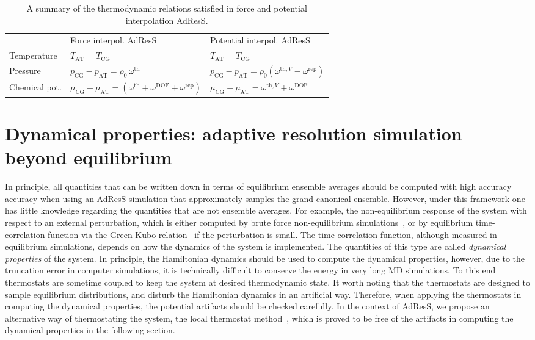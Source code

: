 \documentclass[epjST]{svjour}
\newcommand{\AT}[0]{\textrm{AT}}
\newcommand{\CG}[0]{\textrm{CG}}
\newcommand{\thf}{{\textrm{th}}}
\newcommand{\rep}{{\textrm{rep}}}
\newcommand{\dof}{{\textrm{DOF}}}
\begin{document}
\begin{table}
  \centering
  \caption{A summary of the thermodynamic relations satisfied in force and potential interpolation AdResS.}
  \label{tab:thermodynamic}
  \begin{tabular*}{0.99\textwidth}{@{\extracolsep{\fill}}lll}\hline\hline
    &         Force interpol. AdResS     &       Potential interpol. AdResS \\
    Temperature    &   {$T_\AT = T_\CG$}                                                & {$T_\AT = T_\CG$}                                        \\
    Pressure       &   {$p_\CG - p_\AT = \rho_0\, \omega^\thf$}                          & {$p_\CG - p_\AT = \rho_0(\omega^{\thf,V} - \omega^\rep)$} \\
    Chemical pot.  &   {$\mu_\CG - \mu_\AT = (\omega^\thf + \omega^\dof +\omega^\rep)$}   & {$\mu_\CG - \mu_\AT = \omega^{\thf,V}+ \omega^\dof$}      \\\hline\hline
  \end{tabular*}
\end{table}


\section{Dynamical properties: adaptive resolution simulation beyond equilibrium}
\label{sec:dynamical}


In principle, all quantities that
can be written down in terms of equilibrium ensemble averages should
be computed with high accuracy accuracy when using an AdResS simulation that approximately samples the grand-canonical ensemble.
However, under this framework one has little knowledge regarding the quantities
that are not ensemble averages.
For example, the non-equilibrium response of the system
with respect to an external perturbation, which is 
either computed by brute force non-equilibrium simulations~\cite{wang2014exploring}, or by
equilibrium time-correlation function via the Green-Kubo
relation~\cite{green1954markoff,kubo1957statistical} if the perturbation is small. The
time-correlation function, although measured in equilibrium
simulations, depends on how the dynamics
of the system is implemented.
The quantities of this type are called \emph{dynamical properties} of the system.
In principle, the Hamiltonian dynamics should be used to compute the dynamical properties,
however, due to the truncation error in computer simulations, it
is technically difficult to conserve the energy in very long MD simulations.
To this end thermostats are sometime coupled to keep the system at desired thermodynamic
state.
It worth noting that the thermostats are designed to sample equilibrium distributions, and 
disturb the Hamiltonian dynamics in an artificial way.
Therefore, when applying the thermostats
in computing the dynamical properties, the potential artifacts
should be checked carefully.
In the context of AdResS, we propose an alternative way of thermostating
the system, the local thermostat method~\cite{wang2014exploring},
which is proved to be free of the artifacts in computing the dynamical properties in the following section.
\end{document}
